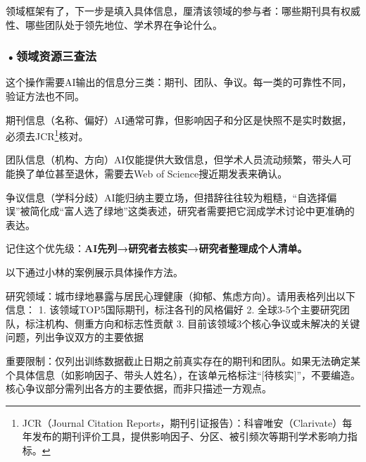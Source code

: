 领域框架有了，下一步是填入具体信息，厘清该领域的参与者：哪些期刊具有权威性、哪些团队处于领先地位、学术界在争论什么。

\subsubsection*{\textbf{•领域资源三查法}}这个操作需要AI输出的信息分三类：期刊、团队、争议。每一类的可靠性不同，验证方法也不同。

期刊信息（名称、偏好）AI通常可靠，但影响因子和分区是快照不是实时数据，必须去JCR\footnote{JCR（Journal Citation Reports，期刊引证报告）：科睿唯安（Clarivate）每年发布的期刊评价工具，提供影响因子、分区、被引频次等期刊学术影响力指标。}核对。

团队信息（机构、方向）AI仅能提供大致信息，但学术人员流动频繁，带头人可能换了单位甚至退休，需要去Web of Science搜近期发表来确认。

争议信息（学科分歧）AI能归纳主要立场，但措辞往往较为粗糙，``自选择偏误''被简化成``富人选了绿地''这类表述，研究者需要把它润成学术讨论中更准确的表达。

记住这个优先级：\textbf{AI先列→研究者去核实→研究者整理成个人清单。}

以下通过小林的案例展示具体操作方法。

\begin{userbox}
研究领域：城市绿地暴露与居民心理健康（抑郁、焦虑方向）。请用表格列出以下信息：
1. 该领域TOP5国际期刊，标注各刊的风格偏好
2. 全球3-5个主要研究团队，标注机构、侧重方向和标志性贡献
3. 目前该领域3个核心争议或未解决的关键问题，列出争议双方的主要依据

重要限制：仅列出训练数据截止日期之前真实存在的期刊和团队。如果无法确定某个具体信息（如影响因子、带头人姓名），在该单元格标注``[待核实]''，不要编造。核心争议部分需列出各方的主要依据，而非只描述一方观点。
\end{userbox}

